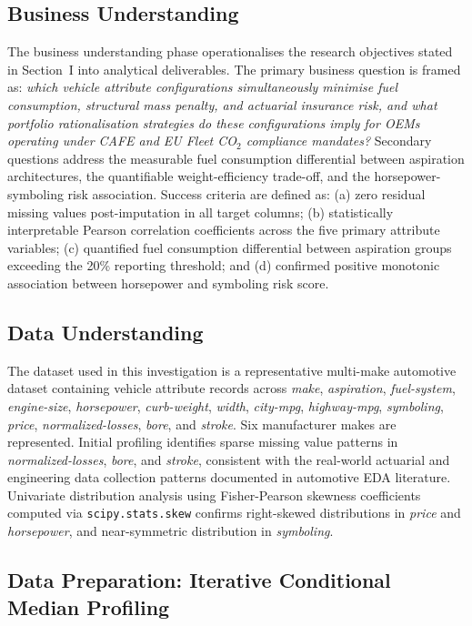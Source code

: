 \documentclass[conference]{IEEEtran}
\begin{document}
\subsection{Business Understanding}

The business understanding phase operationalises the research objectives
stated in Section~I into analytical deliverables. The primary business
question is framed as: \textit{which vehicle attribute configurations
simultaneously minimise fuel consumption, structural mass penalty,
and actuarial insurance risk, and what portfolio rationalisation
strategies do these configurations imply for OEMs operating under
CAFE and EU Fleet CO$_2$ compliance mandates?} Secondary questions
address the measurable fuel consumption differential between aspiration
architectures, the quantifiable weight-efficiency trade-off, and the
horsepower-symboling risk association. Success criteria are defined as:
(a) zero residual missing values post-imputation in all target columns;
(b) statistically interpretable Pearson correlation coefficients across
the five primary attribute variables; (c) quantified fuel consumption
differential between aspiration groups exceeding the 20\% reporting
threshold; and (d) confirmed positive monotonic association between
horsepower and symboling risk score.

\subsection{Data Understanding}

The dataset used in this investigation is a representative multi-make
automotive dataset containing vehicle attribute records across
\textit{make}, \textit{aspiration}, \textit{fuel-system},
\textit{engine-size}, \textit{horsepower}, \textit{curb-weight},
\textit{width}, \textit{city-mpg}, \textit{highway-mpg},
\textit{symboling}, \textit{price}, \textit{normalized-losses},
\textit{bore}, and \textit{stroke}. Six manufacturer makes are
represented. Initial profiling identifies sparse missing value patterns
in \textit{normalized-losses}, \textit{bore}, and \textit{stroke},
consistent with the real-world actuarial and engineering data collection
patterns documented in automotive EDA literature. Univariate distribution
analysis using Fisher-Pearson skewness coefficients computed via
\texttt{scipy.stats.skew} confirms right-skewed distributions in
\textit{price} and \textit{horsepower}, and near-symmetric distribution
in \textit{symboling}.

\subsection{Data Preparation: Iterative Conditional Median Profiling}
\end{document}
